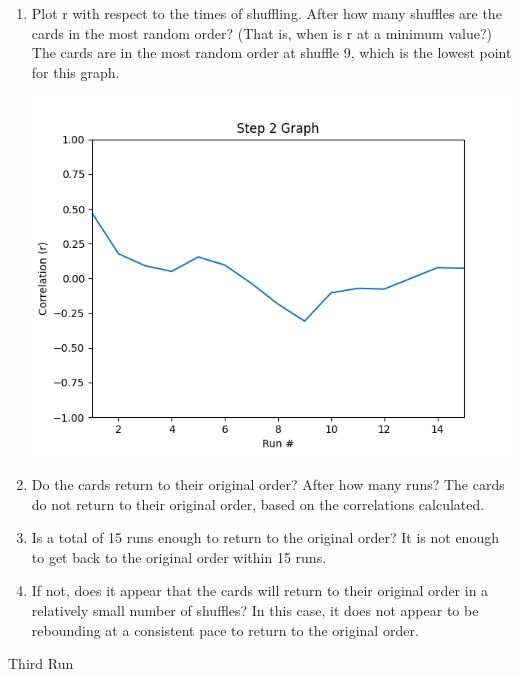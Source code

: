 \documentclass[12pt]{article}
\begin{document}
    \begin{enumerate}
        \item Plot r with respect to the times of shuffling. After how many shuffles are the cards 
        in the most random order? (That is, when is r at a minimum value?)
        \subitem The cards are in the most random order at shuffle 9, which is the lowest point for this graph.\\
        \begin{minipage}[t]{\linewidth}
            \centering
            {
              \includegraphics[width=.7\linewidth]{Figure_2.png}
            }
            \medskip       
        \end{minipage}
        \item Do the cards return to their original order?  After how many runs?
        \subitem The cards do not return to their original order, based on the correlations calculated.
        \item Is a total of 15 runs enough to return to the original order?
        \subitem It is not enough to get back to the original order within 15 runs.
        \item If not, does it appear that the cards will return to their original order in a relatively 
        small number of shuffles?
        \subitem In this case, it does not appear to be rebounding at a consistent pace to return to the original order.
    \end{enumerate}
    \newpage
    \begin{center}
        \small Third Run
    \end{center}
\end{document}
